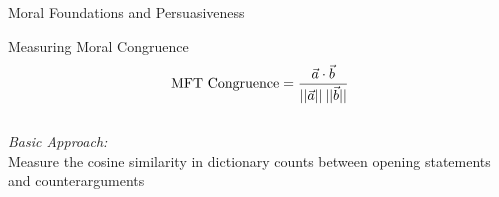 \documentclass{beamer}
\begin{document}
\begin{frame}{Moral Foundations and Persuasiveness}
\begin{figure}
\end{figure}
\end{frame}

\begin{frame}{Measuring Moral Congruence}\centering
\begin{equation*}
\text{MFT Congruence}=\dfrac{\vec{a}\cdot \vec{b}}{||\vec{a}||\hspace{.2em}||\vec{b}||}
\end{equation*}
\vspace{2em}\\
\large{\emph{Basic Approach:}\\Measure the cosine similarity in dictionary counts between opening statements and counterarguments}
\end{frame}
\end{document}
